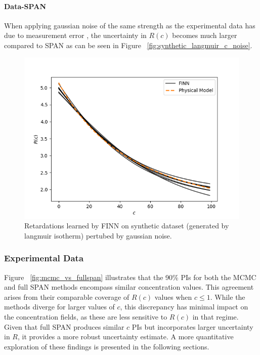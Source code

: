 \paragraph{Data-SPAN}
When applying gaussian noise of the same strength as the experimental data has due to measurement error \cite{nowak2016entropy}, the uncertainty in $R(c)$ becomes much larger compared to SPAN as can be seen in Figure ~\vref{fig:synthetic_langmuir_c_noise}.

\begin{figure}[h]
    \centering
    \includegraphics{figs/finn_synthetic_langmuir_c_noise.png}
    \caption{Retardations learned by FINN on synthetic dataset (generated by langmuir isotherm) pertubed by gaussian noise.}
    \label{fig:synthetic_langmuir_c_noise}
\end{figure}



\subsubsection{Experimental Data}

Figure ~\vref{fig:mcmc_vs_fullspan} illustrates that the 90\% PIs for both the MCMC and full SPAN methods encompass similar concentration values. This agreement arises from their comparable coverage of $R(c)$ values when $c \leq 1$. While the methods diverge for larger values of $c$, this discrepancy has minimal impact on the concentration fields, as these are less sensitive to $R(c)$ in that regime. Given that full SPAN produces similar $c$ PIs but incorporates larger uncertainty in $R$, it provides a more robust uncertainty estimate. A more quantitative exploration of these findings is presented in the following sections.


